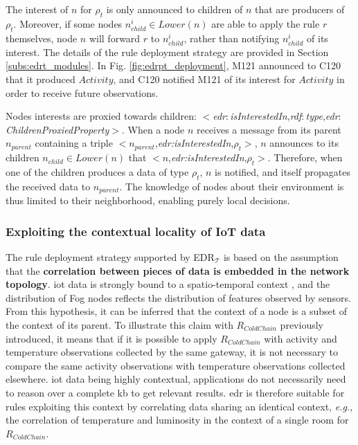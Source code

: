 \documentclass{iosart2c}
\newcommand{\edrt}{EDR$_{\mathcal{T}}$\xspace}
\newcommand{\namespace}[1]{\textit{#1$:$}}
\newcommand{\concept}[2]{\namespace{#1}\-\textit{#2}}
\newcommand{\triplet}[3]{$<$#1,\textit{#2},#3$>$}
\begin{document}
The interest of $n$ for $\rho_t$ is only announced to children of $n$ that are producers of $\rho_t$.
Moreover, if some nodes $n^i_{child}\in Lower(n)$ are able to apply the rule $r$ themselves, node $n$ will forward $r$ to $n^i_{child}$, rather than notifying $n^i_{child}$ of its interest.
The details of the rule deployment strategy are provided in Section \textsection \ref{subs:edrt_modules}.
In Fig. \ref{fig:edrpt_deployment}, M121 announced to C120 that it produced $Activity$, and C120 notified M121 of its interest for $Activity$ in order to receive future observations.

Nodes interests are proxied towards children: \triplet{\concept{edr}{is\-Interested\-In}}{\concept{rdf}{type}}{\concept{edr}{Children\-Proxied\-Property}}.
When a node $n$ receives a message from its parent $n_{parent}$ containing a triple \triplet{$n_{parent}$}{edr:is\-Interested\-In}{$\rho_t$}, $n$ announces to its children $n_{child}\in Lower(n)$ that \triplet{$n$}{edr:is\-Interested\-In}{$\rho_t$}.
Therefore, when one of the children produces a data of type $\rho_t$, $n$ is notified, and itself propagates the received data to $n_{parent}$.
The knowledge of nodes about their environment is thus limited to their neighborhood, enabling purely local decisions.

\subsubsection{Exploiting the contextual locality of IoT data}
\label{subsubs:topology_rules}

The rule deployment strategy supported by \edrt is based on the assumption that the \textbf{correlation between pieces of data is embedded in the network topology}. 
\gls{iot} data is strongly bound to a spatio-temporal context \cite{Perera2014_context}, and the distribution of Fog nodes reflects the distribution of features observed by sensors.
From this hypothesis, it can be inferred that the context of a node is a subset of the context of its parent.
To illustrate this claim with $R_{ColdChain}$ previously introduced, it means that if it is possible to apply $R_{ColdChain}$ with activity and temperature observations collected by the same gateway, it is not necessary to compare the same activity observations with temperature observations collected elsewhere.
\gls{iot} data being highly contextual, applications do not necessarily need to reason over a complete \gls{kb} to get relevant results.
\gls{edr} is therefore suitable for rules exploiting this context by correlating data sharing an identical context, \textit{e.g.,} the correlation of temperature and luminosity in the context of a single room for $R_{ColdChain}$.
\end{document}
